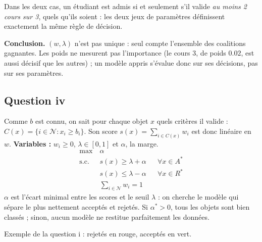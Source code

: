 \documentclass[10pt,a4paper]{article}
\newcommand{\N}{\mathcal{N}}
\begin{document}
Dans les deux cas, un étudiant est admis si et seulement s'il valide
\emph{au moins 2 cours sur 3}, quels qu'ils soient : les deux jeux de paramètres
définissent exactement la même règle de décision.

\textbf{Conclusion.} $(w,\lambda)$ n'est pas unique : seul compte l'ensemble des coalitions gagnantes.
Les poids ne mesurent pas l'importance (le cours 3, de poids $0.02$, est aussi décisif que les autres) ;
un modèle appris s'évalue donc sur ses décisions, pas sur ses paramètres.

\subsection*{Question iv}

Comme $b$ est connu, on sait pour chaque objet $x$ quels critères il valide : $C(x)=\{i\in\N : x_i\geq b_i\}$.
Son score $s(x)=\sum_{i\in C(x)} w_i$ est donc linéaire en $w$.
\textbf{Variables :} $w_i\geq 0$, $\lambda\in[0,1]$ et $\alpha$, la marge.
\begin{align*}
\max\ & \alpha \\
\text{s.c.}\ & s(x) \geq \lambda + \alpha && \forall x\in A^* \\
& s(x) \leq \lambda - \alpha && \forall x\in R^* \\
& \textstyle\sum_{i\in\N} w_i = 1
\end{align*}
$\alpha$ est l'écart minimal entre les scores et le seuil $\lambda$ : on cherche le modèle qui sépare le plus nettement
acceptés et rejetés. Si $\alpha^*>0$, tous les objets sont bien classés ; sinon, aucun modèle ne restitue parfaitement les données.

\begin{center}

\footnotesize Exemple de la question i : rejetés en rouge, acceptés en vert.
\end{center}
\end{document}
